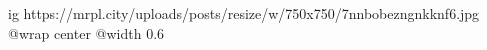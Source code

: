  
 
 
 
 

\ifcmt
  ig https://mrpl.city/uploads/posts/resize/w/750x750/7nnbobezngnkknf6.jpg
  @wrap center
  @width 0.6
\fi
